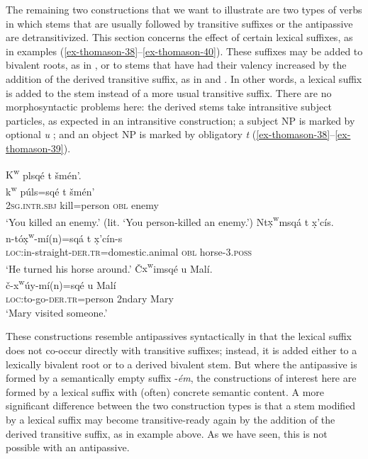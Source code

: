 \documentclass[output=paper,colorlinks,citecolor=brown]{langscibook}
\begin{document}
The remaining two constructions that we want to illustrate are two
types of verbs in which stems that are usually followed by transitive
suffixes or the antipassive are detransitivized.  This section
concerns the effect of certain lexical suffixes, as in examples (\ref{ex-thomason-38}--\ref{ex-thomason-40}).
These suffixes may be added to bivalent roots, as in , or to stems
that have had their valency increased by the addition of the derived
transitive suffix, as in  and .  In other words, a lexical suffix
is added to the stem instead of a more usual transitive suffix.  There
are no morphosyntactic problems here: the derived stems take
intransitive subject particles, as expected in an intransitive
construction; a subject NP is marked by optional \emph{{\textltilde}u}
; and an object NP is marked by obligatory \emph{t} (\ref{ex-thomason-38}--\ref{ex-thomason-39}).

\ea 
\label{ex-thomason-38}
{K\textsuperscript w} plsq\'e t \v{s}m\'en'. \\
\gll  k\textsuperscript w p\'uls=sq\'e t \v{s}m\'en' \\
\textsc{2sg}.\textsc{intr.sbj} kill=person \textsc{obl} enemy \\
\glt `You killed an enemy.' (lit. `You person-killed an enemy.')
\ex 
\label{ex-thomason-39}
Nt{\d{x}\textsuperscript w}msq\'a t \d{x}{\textcrlambda}'c\'is. \\
\gll n-t\'o{\d{x}\textsuperscript w}-m\'i(n)=sq\'a t
 \d{x}{\textcrlambda}'c\'in-s \\
\textsc{loc}:in-straight-\textsc{der.tr}=domestic.animal \textsc{obl} horse-3.\textsc{poss} \\
\glt `He turned his horse around.'
\ex  
\label{ex-thomason-40}
{\v{C}{x\textsuperscript w}imsq\'e {\textltilde}u Mal\'i.} \\
\gll \v{c}-{x\textsuperscript w}\'uy-m\'i(n)=sq\'e {\textltilde}u Mal\'i \\
\textsc{loc}:to-go-\textsc{der.tr}=person 2ndary Mary \\
\glt `Mary visited someone.'
\z

These constructions resemble antipassives syntactically in that the
lexical suffix does not co-occur directly with transitive suffixes;
instead, it is added either to a lexically bivalent root or to a
derived bivalent stem.  But where the antipassive is formed by a
semantically empty suffix -\emph{\'em}, the constructions of interest
here are formed by a lexical suffix with (often) concrete semantic
content.  A more significant difference between the two construction
types is that a stem modified by a lexical suffix may become
transitive-ready again by the addition of the derived transitive
suffix, as in example  above.  As we have seen, this is not possible
with an antipassive.
\end{document}
